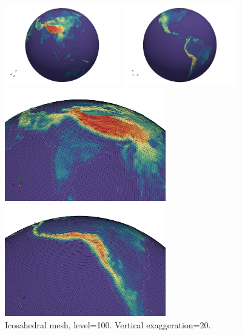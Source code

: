 \begin{center}
\includegraphics[width=5cm]{python_codes/fieldstone_69/topo/topo3D_2.png}
\includegraphics[width=5cm]{python_codes/fieldstone_69/topo/topo3D_3.png}\\
\includegraphics[width=7cm]{python_codes/fieldstone_69/topo/topo3D_4.png}
\includegraphics[width=7cm]{python_codes/fieldstone_69/topo/topo3D_5.png}\\
{\captionfont Icosahedral mesh, level=100. Vertical exaggeration=20.}
\end{center}
